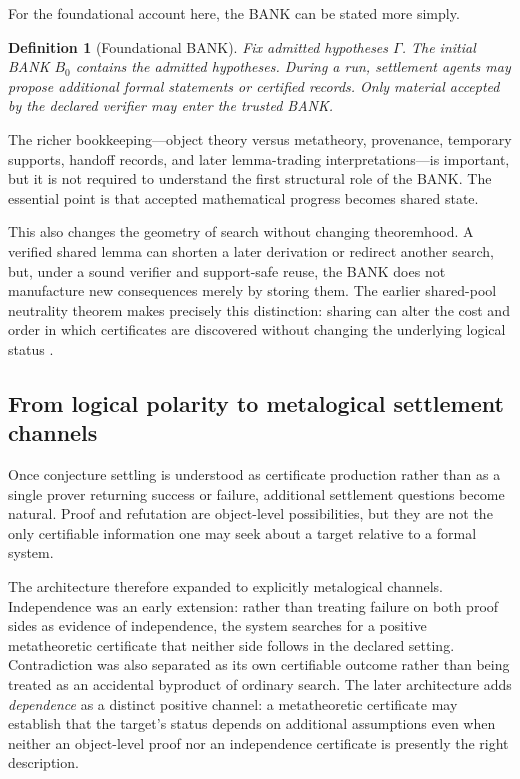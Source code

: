 \documentclass[11pt]{article}
\newtheorem{definition}{Definition}[section]
\begin{document}
For the foundational account here, the BANK can be stated more simply.

\begin{definition}[Foundational BANK]
Fix admitted hypotheses $\Gamma$. The initial BANK $B_0$ contains the admitted hypotheses. During a run, settlement agents may propose additional formal statements or certified records. Only material accepted by the declared verifier may enter the trusted BANK.
\end{definition}

The richer bookkeeping---object theory versus metatheory, provenance, temporary supports, handoff records, and later lemma-trading interpretations---is important, but it is not required to understand the first structural role of the BANK. The essential point is that accepted mathematical progress becomes shared state.

This also changes the geometry of search without changing theoremhood. A verified shared lemma can shorten a later derivation or redirect another search, but, under a sound verifier and support-safe reuse, the BANK does not manufacture new consequences merely by storing them. The earlier shared-pool neutrality theorem makes precisely this distinction: sharing can alter the cost and order in which certificates are discovered without changing the underlying logical status \cite{ald47}.

\subsection{From logical polarity to metalogical settlement channels}

Once conjecture settling is understood as certificate production rather than as a single prover returning success or failure, additional settlement questions become natural. Proof and refutation are object-level possibilities, but they are not the only certifiable information one may seek about a target relative to a formal system.

The architecture therefore expanded to explicitly metalogical channels. Independence was an early extension: rather than treating failure on both proof sides as evidence of independence, the system searches for a positive metatheoretic certificate that neither side follows in the declared setting. Contradiction was also separated as its own certifiable outcome rather than being treated as an accidental byproduct of ordinary search. The later architecture adds \emph{dependence} as a distinct positive channel: a metatheoretic certificate may establish that the target's status depends on additional assumptions even when neither an object-level proof nor an independence certificate is presently the right description.
\end{document}
